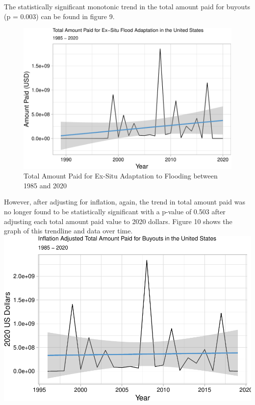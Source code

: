 \documentclass[
  12pt,
]{article}
\begin{document}
The statistically significant monotonic trend in the total amount paid
for buyouts (p = 0.003) can be found in figure 9. \newline

\begin{figure}
\centering
\includegraphics{finalreport_files/figure-latex/unnamed-chunk-15-1.pdf}
\caption{Total Amount Paid for Ex-Situ Adaptation to Flooding between
1985 and 2020}
\end{figure}

However, after adjusting for inflation, again, the trend in total amount
paid was no longer found to be statistically significant with a p-value
of 0.503 after adjusting each total amount paid value to 2020 dollars.
Figure 10 shows the graph of this trendline and data over time. \newline
\includegraphics{finalreport_files/figure-latex/unnamed-chunk-16-1.pdf}
\end{document}

